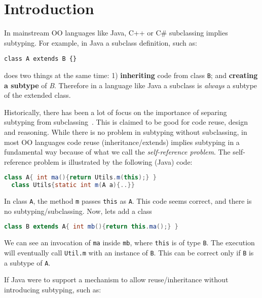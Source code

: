 \section{Introduction}

In mainstream OO languages like Java, C++ or C\# subclassing 
implies subtyping. For example, in Java a subclass definition, such as:

\begin{lstlisting}
class A extends B {}
\end{lstlisting}

\noindent does two things at the same time:
1) {\bf inheriting} code from class \lstinline{B}; and {\bf creating 
a subtype} of \emph{B}. Therefore in a language like Java 
a subclass is \emph{always} a subtype of the extended class.

Historically, there has been a lot of focus on the importance of
separing subtyping from subclassing~\cite{cook}.  This is claimed to be
good for code reuse, design and reasoning. 
While there is no problem
in subtyping without subclassing, in most OO languages code reuse
(inheritance/extends) implies subtyping in a fundamental way because 
of what we call the \emph{self-reference problem}. The self-reference
problem is illustrated by the following (Java) code:

\begin{lstlisting}[language=Java]
  class A{ int ma(){return Utils.m(this);} }
  class Utils{static int m(A a){..}}
\end{lstlisting}

In class \lstinline{A}, the method \lstinline{m} passes \lstinline{this} as \lstinline{A}.
This code seems correct, and there is no subtyping/subclassing.
Now, lets add a class \Q@B@

\begin{lstlisting}[language=Java]
  class B extends A{ int mb(){return this.ma();} }  
\end{lstlisting}

We can see an invocation of \lstinline{ma} inside
\lstinline{mb}, where \lstinline{this} is of type \lstinline{B}. 
The execution will eventually call \lstinline{Util.m} with an
instance of \lstinline{B}. This can be correct only if \lstinline{B} is a subtype of
\lstinline{A}. 

If Java were to support a mechanism to allow reuse/inheritance 
without introducing subtyping, such as:

